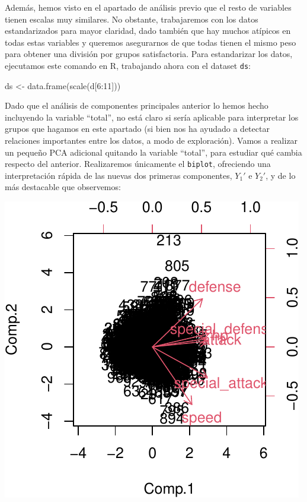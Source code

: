 \documentclass[
  11.8pt,
]{extreport}
\newenvironment{Shaded}{\begin{snugshade}}{\end{snugshade}}
\newcommand{\DecValTok}[1]{\textcolor[rgb]{0.68,0.00,0.00}{#1}}
\newcommand{\FunctionTok}[1]{\textcolor[rgb]{0.28,0.35,0.67}{#1}}
\newcommand{\NormalTok}[1]{\textcolor[rgb]{0.00,0.23,0.31}{#1}}
\newcommand{\OtherTok}[1]{\textcolor[rgb]{0.00,0.23,0.31}{#1}}
\newcommand{\SpecialCharTok}[1]{\textcolor[rgb]{0.37,0.37,0.37}{#1}}
\begin{document}
Además, hemos visto en el apartado de análisis previo que el resto de
variables tienen escalas muy similares. No obstante, trabajaremos con
los datos estandarizados para mayor claridad, dado también que hay
muchos atípicos en todas estas variables y queremos asegurarnos de que
todas tienen el mismo peso para obtener una división por grupos
satisfactoria. Para estandarizar los datos, ejecutamos este comando en
R, trabajando ahora con el dataset \texttt{ds}:

\begin{Shaded}
\begin{Highlighting}[]
\NormalTok{ds }\OtherTok{\textless{}{-}} \FunctionTok{data.frame}\NormalTok{(}\FunctionTok{scale}\NormalTok{(d[}\DecValTok{6}\SpecialCharTok{:}\DecValTok{11}\NormalTok{]))}
\end{Highlighting}
\end{Shaded}

Dado que el análisis de componentes principales anterior lo hemos hecho
incluyendo la variable ``total'', no está claro si sería aplicable para
interpretar los grupos que hagamos en este apartado (si bien nos ha
ayudado a detectar relaciones importantes entre los datos, a modo de
exploración). Vamos a realizar un pequeño PCA adicional quitando la
variable ``total'', para estudiar qué cambia respecto del anterior.
Realizaremos únicamente el \texttt{biplot}, ofreciendo una
interpretación rápida de las nuevas dos primeras componentes, \(Y_1'\) e
\(Y_2'\), y de lo más destacable que observemos:

\begin{center}
\includegraphics{trabajo_files/figure-pdf/unnamed-chunk-40-1.pdf}
\end{center}
\end{document}
